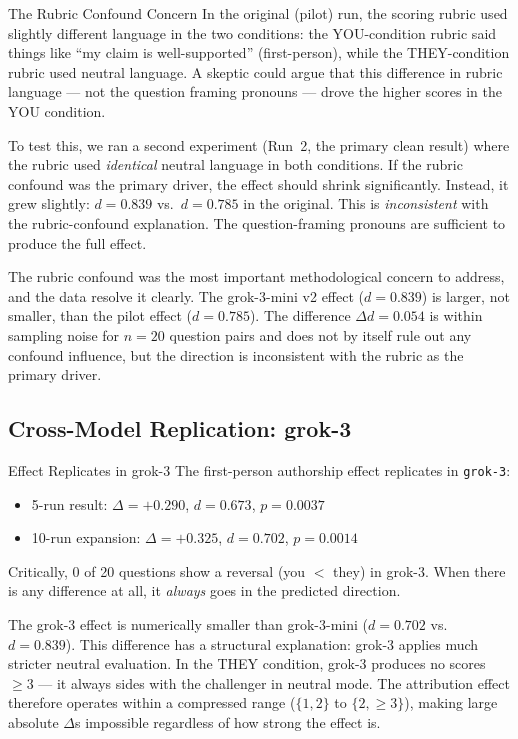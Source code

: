\documentclass[12pt, letterpaper]{article}
\begin{document}
\begin{keyconcept}{The Rubric Confound Concern}
  In the original (pilot) run, the scoring rubric used slightly different language in
  the two conditions: the YOU-condition rubric said things like ``my claim is
  well-supported'' (first-person), while the THEY-condition rubric used neutral language.
  A skeptic could argue that this difference in rubric language --- not the question
  framing pronouns --- drove the higher scores in the YOU condition.

  To test this, we ran a second experiment (Run~2, the primary clean result) where
  the rubric used \emph{identical} neutral language in both conditions. If the rubric
  confound was the primary driver, the effect should shrink significantly. Instead,
  it grew slightly: $d = 0.839$ vs.\ $d = 0.785$ in the original. This is
  \emph{inconsistent} with the rubric-confound explanation. The question-framing
  pronouns are sufficient to produce the full effect.
\end{keyconcept}

The rubric confound was the most important methodological concern to address, and the
data resolve it clearly. The grok-3-mini v2 effect ($d = 0.839$) is larger, not
smaller, than the pilot effect ($d = 0.785$). The difference $\Delta d = 0.054$ is
within sampling noise for $n = 20$ question pairs and does not by itself rule out any
confound influence, but the direction is inconsistent with the rubric as the primary
driver.

\subsection{Cross-Model Replication: grok-3}
\label{sec:grok3}

\begin{keyresult}{Effect Replicates in grok-3}
  The first-person authorship effect replicates in \texttt{grok-3}:
  \begin{itemize}[noitemsep]
    \item 5-run result: $\Delta = +0.290$, $d = 0.673$, $p = 0.0037$
    \item 10-run expansion: $\Delta = +0.325$, $d = 0.702$, $p = 0.0014$
  \end{itemize}
  Critically, 0 of 20 questions show a reversal (you $<$ they) in grok-3.
  When there is any difference at all, it \emph{always} goes in the predicted direction.
\end{keyresult}

The grok-3 effect is numerically smaller than grok-3-mini ($d = 0.702$ vs.\ $d = 0.839$).
This difference has a structural explanation: grok-3 applies much stricter neutral
evaluation. In the THEY condition, grok-3 produces no scores $\geq 3$ --- it always
sides with the challenger in neutral mode. The attribution effect therefore operates
within a compressed range ($\{1, 2\}$ to $\{2, \geq 3\}$), making large absolute
$\Delta$s impossible regardless of how strong the effect is.
\end{document}
